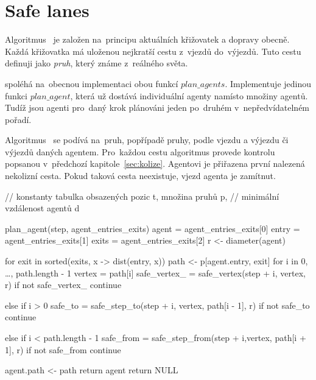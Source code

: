 \section{Safe lanes}\label{sec:safe_lanes}

Algoritmus~ je založen na~principu aktuálních křižovatek a dopravy obecně.
Každá křižovatka má uloženou nejkratší cestu z~vjezdů do~výjezdů.
Tuto cestu definuji jako \emph{pruh}, který známe z~reálného světa.

 spoléhá na~obecnou implementaci obou funkcí $plan\_agents$.
Implementuje jedinou funkci $plan\_agent$, která už dostává individuální agenty namísto množiny agentů.
Tudíž jsou agenti pro~daný krok plánováni jeden po~druhém v~nepředvídatelném pořadí.

Algoritmus~ se podívá na~pruh, popřípadě pruhy, podle vjezdu a výjezdu či výjezdů daných agentem.
Pro~každou cestu algoritmus provede kontrolu popsanou v~předchozí kapitole~\ref{sec:kolize}.
Agentovi je přiřazena první nalezená nekolizní cesta.
Pokud taková cesta neexistuje, vjezd agenta je zamítnut.

\begin{code}
// konstanty tabulka obsazených pozic t, množina pruhů p,
// minimální vzdálenost agentů d

plan_agent(step, agent_entries_exits)
  agent = agent_entries_exits[0]
  entry = agent_entries_exits[1]
  exits = agent_entries_exits[2]
  r <- diameter(agent)

  for exit in sorted(exits, x -> dist(entry, x))
    path <- p[agent.entry, exit]
    for i in 0, \ldots, path.length - 1
      vertex = path[i]
      safe_vertex_ = safe_vertex(step + i, vertex, r)
      if not safe_vertex_
        continue

      else if i > 0
        safe_to = safe_step_to(step + i, vertex, path[i - 1], r)
        if not safe_to
          continue

      else if i < path.length - 1
        safe_from = safe_step_from(step + i,vertex, path[i + 1], r)
        if not safe_from
          continue

    agent.path <- path
    return agent
  return NULL
\end{code}
